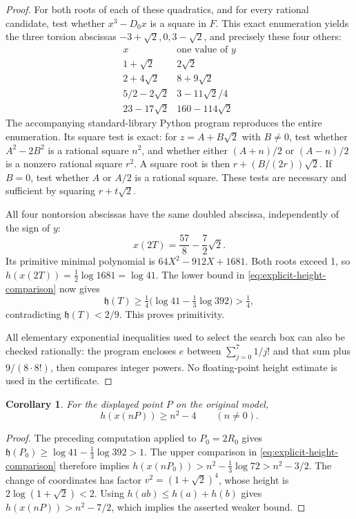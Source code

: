 \documentclass[11pt]{article}
\newtheorem{corollary}[theorem]{Corollary}
\theoremstyle{definition}
\begin{document}
\begin{proof}
For both roots of each of these quadratics, and for every rational
candidate, test whether \(x^3-D_0x\) is a square in \(F\).
This exact enumeration yields the three torsion abscissas
\(-3+\sqrt2,0,3-\sqrt2\), and precisely these four others:
\[
\begin{array}{c|c}
x&\text{one value of }y\\\hline
1+\sqrt2&2\sqrt2\\
2+4\sqrt2&8+9\sqrt2\\
5/2-2\sqrt2&3-11\sqrt2/4\\
23-17\sqrt2&160-114\sqrt2
\end{array}
\]
The accompanying standard-library Python program reproduces the
entire enumeration. Its square test is exact: for \(z=A+B\sqrt2\)
with \(B\ne0\), test whether \(A^2-2B^2\) is a rational square
\(n^2\), and whether either \((A+n)/2\) or \((A-n)/2\) is a
nonzero rational square \(r^2\). A square root is then
\(r+(B/(2r))\sqrt2\). If \(B=0\), test whether \(A\) or
\(A/2\) is a rational square. These tests are necessary and
sufficient by squaring \(r+t\sqrt2\).

All four nontorsion abscissas have the same doubled abscissa,
independently of the sign of \(y\):
\[
 x(2T)=\frac{57}{8}-\frac72\sqrt2.
\]
Its primitive minimal polynomial is \(64X^2-912X+1681\).
Both roots exceed 1, so \(h(x(2T))=\tfrac12\log1681=\log41\).
The lower bound in \eqref{eq:explicit-height-comparison} now gives
\[
 \mathfrak h(T)\ge
 \tfrac14\bigl(\log41-\tfrac13\log392\bigr)>\tfrac14,
\]
contradicting \(\mathfrak h(T)<2/9\). This proves primitivity.

All elementary exponential inequalities used to select the search
box can also be checked rationally: the program encloses \(e\)
between \(\sum_{j=0}^7 1/j!\) and that sum plus
\(9/(8\cdot8!)\), then compares integer powers. No floating-point
height estimate is used in the certificate.
\end{proof}

\begin{corollary}\label{cor:height-constants}
For the displayed point \(P\) on the original model,
\[
                 h(x(nP))\ge n^2-4\qquad(n\ne0).
\]

\end{corollary}
\begin{proof}
The preceding computation applied to \(P_0=2R_0\) gives
\(\mathfrak h(P_0)\ge\log41-\tfrac13\log392>1\).
The upper comparison in \eqref{eq:explicit-height-comparison}
therefore implies
\(h(x(nP_0))>n^2-\tfrac13\log72>n^2-3/2\).
The change of coordinates has factor
\(v^2=(1+\sqrt2)^4\), whose height is
\(2\log(1+\sqrt2)<2\). Using
\(h(ab)\le h(a)+h(b)\) gives
\(h(x(nP))>n^2-7/2\), which implies the asserted weaker bound.
\end{proof}
\end{document}
